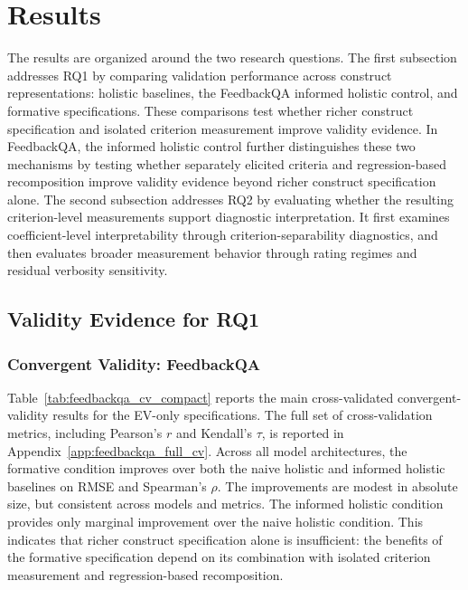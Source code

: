 
\section{Results}

The results are organized around the two research questions. The first subsection addresses RQ1 by comparing validation performance across construct representations: holistic baselines, the FeedbackQA informed holistic control, and formative specifications. These comparisons test whether richer construct specification and isolated criterion measurement improve validity evidence. In FeedbackQA, the informed holistic control further distinguishes these two mechanisms by testing whether separately elicited criteria and regression-based recomposition improve validity evidence beyond richer construct specification alone. The second subsection addresses RQ2 by evaluating whether the resulting criterion-level measurements support diagnostic interpretation. It first examines coefficient-level interpretability through criterion-separability diagnostics, and then evaluates broader measurement behavior through rating regimes and residual verbosity sensitivity.


\subsection{Validity Evidence for RQ1}

\subsubsection{Convergent Validity: FeedbackQA}\label{sec:res_conv_val}

Table~\ref{tab:feedbackqa_cv_compact} reports the main cross-validated convergent-validity results for the EV-only specifications. The full set of cross-validation metrics, including Pearson's $r$ and Kendall's $\tau$, is reported in Appendix~\ref{app:feedbackqa_full_cv}. Across all model architectures, the formative condition improves over both the naive holistic and informed holistic baselines on RMSE and Spearman's $\rho$. The improvements are modest in absolute size, but consistent across models and metrics. The informed holistic condition provides only marginal improvement over the naive holistic condition. This indicates that richer construct specification alone is insufficient: the benefits of the formative specification depend on its combination with isolated criterion measurement and regression-based recomposition.

